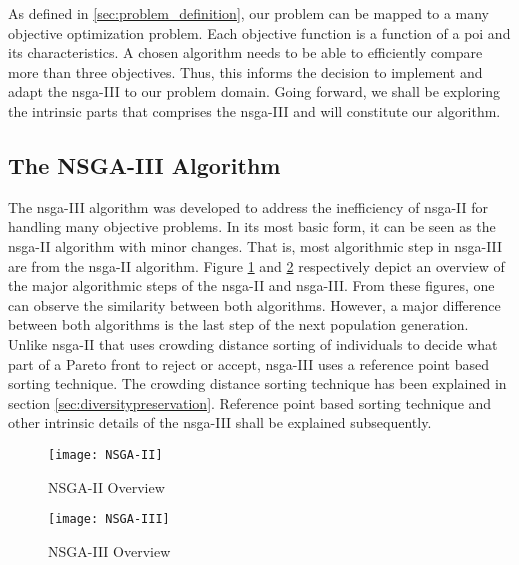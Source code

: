 As defined in \ref{sec:problem_definition}, our problem can be mapped to a many objective optimization problem. Each objective function is a function of a \gls{poi} and its characteristics. A chosen algorithm needs to be able to efficiently compare more than three objectives. Thus, this informs the decision to implement and adapt the \gls{nsga}-III to our problem domain. Going forward, we shall be exploring the intrinsic parts that comprises the \gls{nsga}-III and will constitute our algorithm.



\subsection{The NSGA-III Algorithm}
The \gls{nsga}-III algorithm was developed to address the inefficiency of \gls{nsga}-II for handling many objective problems. In its most basic form, it can be seen as the \gls{nsga}-II algorithm with minor changes. That is, most algorithmic step in \gls{nsga}-III are from the \gls{nsga}-II algorithm. Figure \ref{fig:nsgaII} and \ref{fig:nsgaIII} respectively depict an overview of the major algorithmic steps of the \gls{nsga}-II and \gls{nsga}-III. From these figures, one can observe the similarity between both algorithms. However, a major difference between both algorithms is the last step of the next population generation. Unlike \gls{nsga}-II that uses crowding distance sorting of individuals to decide what part of a Pareto front to reject or accept, \gls{nsga}-III uses a reference point based sorting technique. The crowding distance sorting technique has been explained in section \ref{sec:diversitypreservation}. Reference point based sorting technique and other intrinsic details of the \gls{nsga}-III shall be explained subsequently.

\begin{figure}
    \centering
    \texttt{[image: NSGA-II]}
    \caption{NSGA-II Overview}
    \label{fig:nsgaII}
\end{figure}

\begin{figure}
    \centering
    \texttt{[image: NSGA-III]}
    \caption{NSGA-III Overview}
    \label{fig:nsgaIII}
\end{figure}

